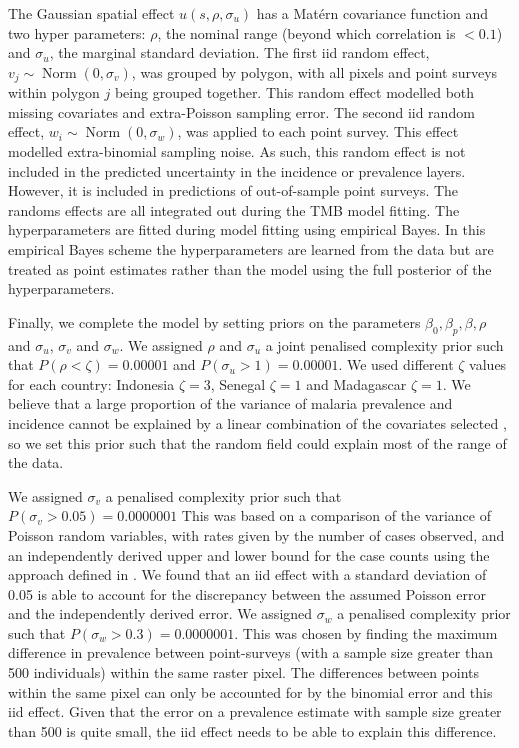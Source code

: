 \documentclass[10pt,letterpaper]{article}
\begin{document}
The Gaussian spatial effect $u(s, \rho, \sigma_u)$ has a Mat\'ern covariance function and two hyper parameters: $\rho$, the nominal range (beyond which correlation is $< 0.1$) and $\sigma_u$, the marginal standard deviation.
The first iid random effect, $v_j \sim \operatorname{Norm}(0, \sigma_v)$,  was grouped by polygon, with all pixels and point surveys within polygon $j$ being grouped together.
This random effect modelled both missing covariates and extra-Poisson sampling error. 
The second iid random effect, $w_i \sim \operatorname{Norm}(0, \sigma_w)$, was applied to each point survey.
This effect modelled extra-binomial sampling noise.
As such, this random effect is not included in the predicted uncertainty in the incidence or prevalence layers.
However, it is included in predictions of out-of-sample point surveys.
The randoms effects are all integrated out during the TMB model fitting.
The hyperparameters are fitted during model fitting using empirical Bayes.
In this empirical Bayes scheme the hyperparameters are learned from the data but are treated as point estimates rather than the model using the full posterior of the hyperparameters.



Finally, we complete the model by setting priors on the parameters $\beta_0, \beta_p, \beta, \rho$ and $\sigma_u$, $\sigma_v$ and $\sigma_w$.
We assigned $\rho$ and $\sigma_u$ a joint penalised complexity prior \cite{fuglstad2018constructing} such that $P(\rho < \zeta) = 0.00001$ and $P(\sigma_u > 1) = 0.00001$.
We used different $\zeta$ values for each country: Indonesia $\zeta = 3$, Senegal $\zeta = 1$ and Madagascar $\zeta = 1$.
We believe that a large proportion of the variance of malaria prevalence and incidence cannot be explained by a linear combination of the covariates selected \cite{bhatt2017improved}, so we set this prior such that the random field could explain most of the range of the data.

We assigned $\sigma_v$ a penalised complexity prior \cite{simpson2017penalising} such that $P(\sigma_v > 0.05) = 0.0000001$
This was based on a comparison of the variance of Poisson random variables, with rates given by the number of cases observed, and an independently derived upper and lower bound for the case counts using the approach defined in \cite{cibulskis2011worldwide}.
We found that an iid effect with a standard deviation of 0.05 is able to account for the discrepancy between the assumed Poisson error and the independently derived error.
We assigned $\sigma_w$ a penalised complexity prior such that $P(\sigma_w > 0.3) = 0.0000001$. 
This was chosen by finding the maximum difference in prevalence between point-surveys (with a sample size greater than 500 individuals) within the same raster pixel.
The differences between points within the same pixel can only be accounted for by the binomial error and this iid effect.
Given that the error on a prevalence estimate with sample size greater than 500 is quite small, the iid effect needs to be able to explain this difference.
\end{document}

